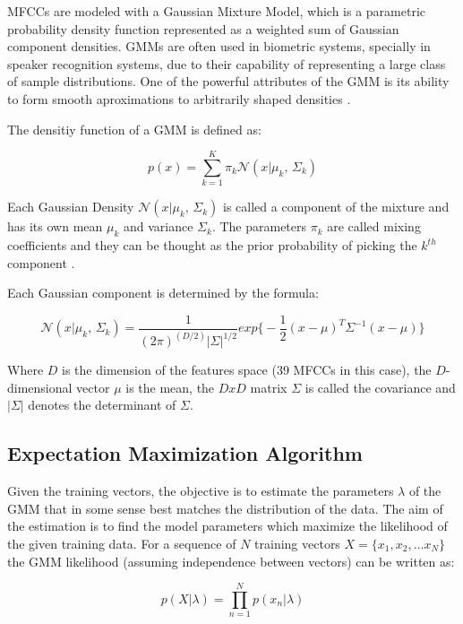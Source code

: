 MFCCs are modeled with a Gaussian Mixture Model, which is a parametric probability density
function represented as a weighted sum of Gaussian component densities. GMMs are often
used in biometric systems, specially in speaker recognition systems, due to their
capability of representing a large class of sample distributions. One of the powerful
attributes of the GMM is its ability to form smooth aproximations to arbitrarily shaped
densities \cite{gmm_reynolds}.

The densitiy function of a GMM is defined as:

\begin{equation}
	p(x) = \sum_{k=1}^{K}\pi_{k} \mathcal{N}(x|\mu_{k},\,\Sigma_{k})
\end{equation}

Each Gaussian Density $\mathcal{N}(x|\mu_{k},\,\Sigma_{k})$ is called a component of the mixture
and has its own mean $\mu_{k}$ and variance $\Sigma_{k}$. The parameters $\pi_{k}$ are called
mixing coefficients and they can be thought as the prior probability of picking the $k^{th}$
component \cite{gmm_bishop}.

Each Gaussian component is determined by the formula:

\begin{equation}
	\mathcal{N}(x|\mu_{k},\,\Sigma_{k}) = \frac{1}{(2\pi)^{(D/2)}|\Sigma|^{1/2}} exp \big\{ -\frac{1}{2}(x-\mu)^{T}\Sigma^{-1}(x-\mu)\}
\end{equation}

Where $D$ is the dimension of the features space (39 MFCCs in this case), the $D$-dimensional
vector $\mu$ is the mean, the $DxD$ matrix $\Sigma$ is called the covariance and $|\Sigma|$
denotes the determinant of $\Sigma$.

\subsection{Expectation Maximization Algorithm}

Given the training vectors, the objective is to estimate the parameters $\lambda$ of the GMM
that in some sense best matches the distribution of the data. The aim of the estimation is
to find the model parameters which maximize the likelihood of the given training data. For a
sequence of $N$ training vectors $X=\{x_{1}, x_{2}, \dotsc x_{N}\}$ the GMM likelihood
(assuming independence between vectors) can be written as:

\begin{equation}
	\label{eq:likelihoodGMM}
	p(X|\lambda) = \prod_{n=1}^{N}p(x_{n}|\lambda)
\end{equation}

